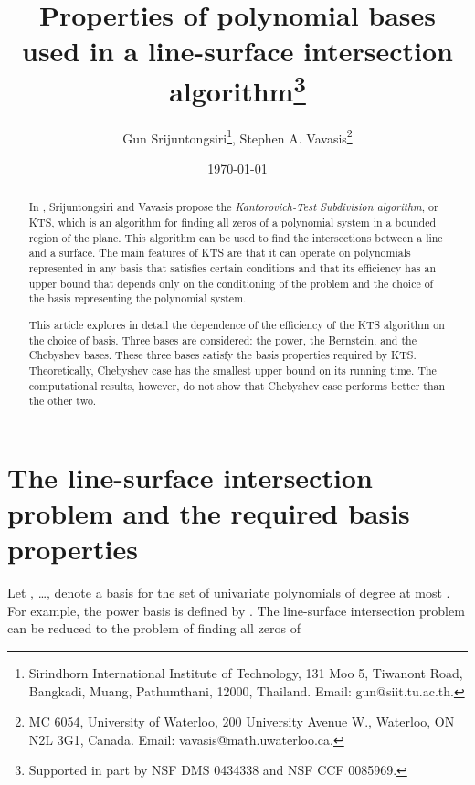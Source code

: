 \documentclass[12pt]{article}
\author{Gun Srijuntongsiri\thanks{Sirindhorn International Institute of Technology, 131 Moo 5, Tiwanont Road,
Bangkadi, Muang, Pathumthani, 12000, Thailand. Email:
gun@siit.tu.ac.th.},
Stephen A. Vavasis\thanks{MC 6054, University of Waterloo, 200
University Avenue W., Waterloo, ON N2L 3G1, Canada. Email:
vavasis@math.uwaterloo.ca.}}
\title{Properties of polynomial bases used in a line-surface intersection algorithm\thanks{Supported in part by NSF DMS 0434338 and NSF CCF 0085969.}}
\date{\today}
\begin{document}
\maketitle
\newcommand{\cond}[1]{\mathop{\rm{cond}}(#1)}
\newcommand{\norm}[1]{\left\|#1\right\|}
\newcommand{\normtwo}[1]{\left\|#1\right\|_2}
\newcommand{\abs}[1]{\left|#1\right|} \newcommand{\norma}[1]{\left\|#1\right\|}   \newcommand{\inv}[1]{#1^{-1}}
\newcommand{\nchoosek}[2]{\left(\begin{array}{c} #1\\ #2 \end{array} \right)}

\newtheorem{thm}{Theorem}[section]
\newtheorem{cor}[thm]{Corollary}
\newtheorem{lemma}[thm]{Lemma}
\newtheorem{prop}{Proposition}[thm]

\theoremstyle{remark}
\newtheorem{rem}[thm]{Remark}

\begin{abstract}
In \cite{srijuntongsiri_lsi}, Srijuntongsiri and Vavasis propose
the \emph{Kantorovich-Test Subdivision algorithm}, or KTS, which is
an algorithm for finding all zeros of a polynomial system in a bounded region
of the plane.  This algorithm can be used to find the intersections between a
line and a surface.  The main features of KTS are that it can operate on
polynomials represented in any basis that satisfies certain
conditions and that its efficiency has an upper bound
that depends only on the conditioning of the problem and the choice of
the basis representing the polynomial system.

This article explores in detail the dependence of the efficiency of the KTS algorithm on the choice of basis.
Three bases are considered: the power, the Bernstein, and the Chebyshev bases.
These three bases satisfy the basis properties required by KTS.
Theoretically, Chebyshev case has the smallest upper bound on its running time.
The computational results, however, do not show that Chebyshev case performs
better than the other two.
\end{abstract}

\section{The line-surface intersection problem and the required basis properties}
\label{section_basis_prop}

Let , \ldots,  denote a basis for the set of
univariate polynomials of degree at most .  For example,
the power basis is defined by .  The line-surface
intersection problem can be reduced to the problem
of finding all zeros of
\end{document}
